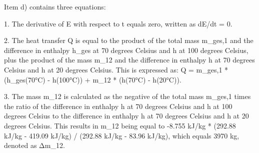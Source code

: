 Item d) contains three equations:

1. The derivative of E with respect to t equals zero, written as dE/dt = 0.

2. The heat transfer Q is equal to the product of the total mass m_ges,1 and the difference in enthalpy h_ges at 70 degrees Celsius and h at 100 degrees Celsius, plus the product of the mass m_12 and the difference in enthalpy h at 70 degrees Celsius and h at 20 degrees Celsius. This is expressed as:
   Q = m_ges,1 * (h_ges(70°C) - h(100°C)) + m_12 * (h(70°C) - h(20°C)).

3. The mass m_12 is calculated as the negative of the total mass m_ges,1 times the ratio of the difference in enthalpy h at 70 degrees Celsius and h at 100 degrees Celsius to the difference in enthalpy h at 70 degrees Celsius and h at 20 degrees Celsius. This results in m_12 being equal to -8.755 kJ/kg * (292.88 kJ/kg - 419.09 kJ/kg) / (292.88 kJ/kg - 83.96 kJ/kg), which equals 3970 kg, denoted as Δm_12.